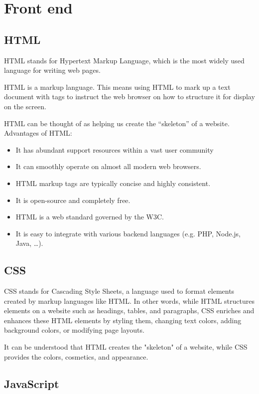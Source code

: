 \documentclass[../Main.tex]{subfiles}
\begin{document}
\section{Front end}

\subsection{HTML}

HTML stands for Hypertext Markup Language, which is the most widely used language for writing web pages.

HTML is a markup language.
This means using HTML to mark up a text document with tags to instruct the web browser on how to structure it for display on the screen.

HTML can be thought of as helping us create the ``skeleton'' of a website.
Advantages of HTML:

\begin{itemize}
    \item It has abundant support resources within a vast user community
    \item It can smoothly operate on almost all modern web browsers.
    \item HTML markup tags are typically concise and highly consistent.
    \item It is open-source and completely free.
    \item HTML is a web standard governed by the W3C.
    \item It is easy to integrate with various backend languages (e.g. PHP, Node.js, Java, \dots).
\end{itemize}

\subsection{CSS}
CSS stands for Cascading Style Sheets, a language used to format elements created by markup languages like HTML.
In other words, while HTML structures elements on a website such as headings, tables, and paragraphs, CSS enriches and enhances these HTML elements by styling them, changing text colors, adding background colors, or modifying page layouts.

It can be understood that HTML creates the "skeleton" of a website, while CSS provides the colors, cosmetics, and appearance.

\subsection{JavaScript}
\end{document}
